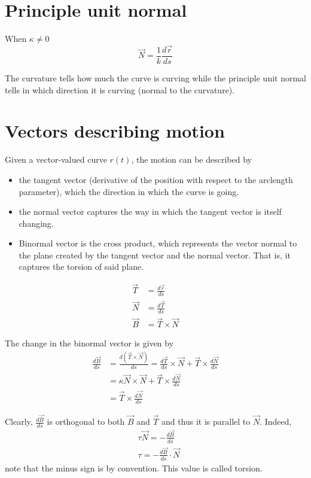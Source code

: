 \documentclass[a4paper]{article}
\begin{document}

\section{Principle unit normal}

When \(\kappa \neq 0\)
\[
    \vec{N} = \frac{1}{k}\frac{d\vec{r}}{ds}
\]

The curvature tells how much the curve is curving while the principle
unit normal tells in which direction it is curving (normal to the curvature).

\section{Vectors describing motion}

Given a vector-valued curve \(r(t)\), the motion can be described by
\begin{itemize}
    \item the tangent vector (derivative of the position
        with respect to the arclength parameter), which the direction in which the curve is going.
    \item the normal vector captures the way in which the tangent vector is itself changing.
    \item Binormal vector is the cross product, which represents the vector normal to the plane
        created by the tangent vector and the normal vector. That is, it captures the torsion of said plane.
\end{itemize}

\begin{align*}
    \vec{T} &= \frac{d\vec{r}}{ds} \\
    \vec{N} &= \frac{d\vec{T}}{ds} \\
    \vec{B} &= \vec{T} \times \vec{N}
\end{align*}

The change in the binormal vector is given by
\begin{align*}
    \frac{d\vec{B}}{ds} &= \frac{d(\vec{T} \times \vec{N})}{ds}
    = \frac{d\vec{T}}{ds} \times \vec{N} + \vec{T} \times \frac{d\vec{N}}{ds} \\
    &= \kappa\vec{N} \times \vec{N} + \vec{T} \times \frac{d\vec{N}}{ds} \\
    &= \vec{T} \times \frac{d\vec{N}}{ds}
\end{align*}

Clearly, \(\frac{d\vec{B}}{ds}\) is orthogonal to both \(\vec{B}\)
and \(\vec{T}\) and thus it is parallel to \(\vec{N}\).
Indeed,
\begin{align*}
    &\tau \vec{N} = -\frac{d\vec{B}}{ds} \\
    &\tau = -\frac{d\vec{B}}{ds} \cdot \vec{N}
\end{align*}
note that the minus sign is by convention.
This value is called torsion.
\end{document}
